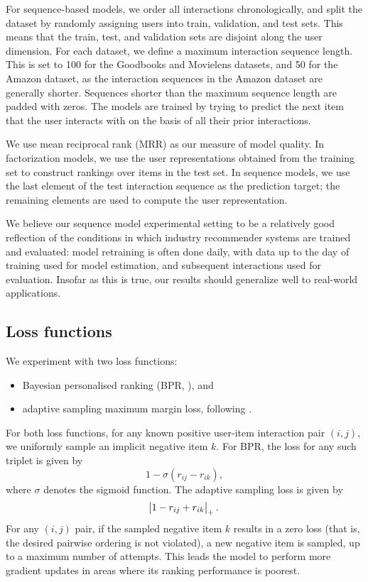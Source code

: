 \documentclass[sigconf]{acmart}
\begin{document}
For sequence-based models, we order all interactions chronologically, and split the dataset by randomly assigning users into train, validation, and test sets. This means that the train, test, and validation sets are disjoint along the user dimension. For each dataset, we define a maximum interaction sequence length. This is set to 100 for the Goodbooks and Movielens datasets, and 50 for the Amazon dataset, as the interaction sequences in the Amazon dataset are generally shorter. Sequences shorter than the maximum sequence length are padded with zeros. The models are trained by trying to predict the next item that the user interacts with on the basis of all their prior interactions.

We use mean reciprocal rank (MRR) as our measure of model quality. In factorization models, we use the user representations obtained from the training set to construct rankings over items in the test set. In sequence models, we use the last element of the test interaction sequence as the prediction target; the remaining elements are used to compute the user representation.

We believe our sequence model experimental setting to be a relatively good reflection of the conditions in which industry recommender systems are trained and evaluated: model retraining is often done daily, with data up to the day of training used for model estimation, and subsequent interactions used for evaluation. Insofar as this is true, our results should generalize well to real-world applications.

\subsection{Loss functions}
We experiment with two loss functions:
\begin{itemize}
\item Bayesian personalised ranking (BPR, \citet{rendle2009bpr}), and
\item adaptive sampling maximum margin loss, following \citet{weston2011wsabie}.
\end{itemize}
For both loss functions, for any known positive user-item interaction pair $(i, j)$, we uniformly sample an implicit negative item $k$. For BPR, the loss for any such triplet is given by
\begin{equation}
1 - \sigma\left(r_{ij} - r_{ik}\right),
\end{equation}
where $\sigma$ denotes the sigmoid function.
The adaptive sampling loss is given by
\begin{equation}
\abs{1 - r_{ij} + r_{ik}}_{+}.
\end{equation}
For any $(i, j)$ pair, if the sampled negative item $k$ results in a zero loss (that is, the desired pairwise ordering is not violated), a new negative item is sampled, up to a maximum number of attempts. This leads the model to perform more gradient updates in areas where its ranking performance is poorest.
\end{document}

